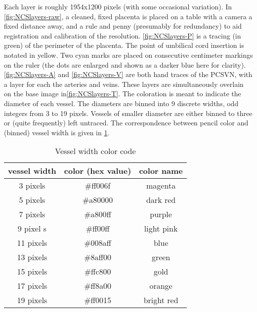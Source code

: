 Each layer is roughly 1954x1200 pixels (with some occasional variation).
In \cref{fig:NCSlayers-raw}, a cleaned, fixed placenta is placed on a table with a camera a fixed distance away, and a rule and penny (presumably for redundancy) to aid registration and calibration of the resolution.
\cref{fig:NCSlayers-P} is a tracing (in green) of the perimeter of the placenta. The point of umbilical cord insertion is notated in yellow. Two cyan marks are placed on consecutive centimeter markings on the ruler (the dots are enlarged and shown as a darker blue here for clarity).
\cref{fig:NCSlayers-A} and \cref{fig:NCSlayers-V} are both hand traces of the PCSVN, with a layer for each the arteries and veins. These layers are simultaneously overlain on the base image in\cref{fig:NCSlayers-T}. The coloration is meant to indicate the diameter of each vessel. The diameters are binned into 9 discrete widths, odd integers from 3 to 19 pixels. Vessels of smaller diameter are either binned to three or (quite frequently) left untraced.
The correspondence between pencil color and (binned) vessel width is given in \cref{tab:widthcolors}.

\begin{table}
    \centering
\begin{tabular}{ccc}
    \hline
    \rule[-1ex]{0pt}{2.5ex}
    vessel width & color (hex value) & color name \\
    \hline 
    \rule[-1ex]{0pt}{2.5ex}
    3 pixels &  \#ff006f &   magenta \\                                      
    \rule[-1ex]{0pt}{2.5ex}
    5 pixels & \#a80000  & dark red \\                                      
    \rule[-1ex]{0pt}{2.5ex}
    7 pixels &  \#a800ff & purple \\                                          
    \rule[-1ex]{0pt}{2.5ex}
    9 pixel s&  \#ff00ff  & light pink \\
    \rule[-1ex]{0pt}{2.5ex}
    11 pixels &  \#008aff & blue \\                                          
    \rule[-1ex]{0pt}{2.5ex}
    13 pixels &  \#8aff00 &   green \\                                        
    \rule[-1ex]{0pt}{2.5ex}
    15 pixels &  \#ffc800 &  gold \\                                    
    \rule[-1ex]{0pt}{2.5ex}
    17 pixels & \#ff8a00  &  orange \\                                         
    \rule[-1ex]{0pt}{2.5ex}
    19 pixels & \#ff0015   &  bright red  \\
    \hline
\end{tabular}
\caption{Vessel width color code}
\label{tab:widthcolors}
\end{table}


